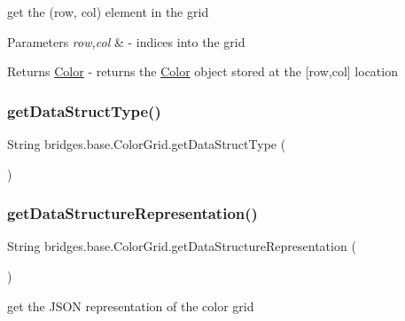 get the (row, col) element in the grid


\begin{DoxyParams}{Parameters}
{\em row,col} & -\/ indices into the grid \\
\hline
\end{DoxyParams}
\begin{DoxyReturn}{Returns}
\mbox{\hyperlink{classbridges_1_1base_1_1_color}{Color}} -\/ returns the \mbox{\hyperlink{classbridges_1_1base_1_1_color}{Color}} object stored at the \mbox{[}row,col\mbox{]} location 
\end{DoxyReturn}
\mbox{\label{classbridges_1_1base_1_1_color_grid_a53a1f3f105f8545796f98e5fac559b5b}} 
\subsubsection{\texorpdfstring{get\+Data\+Struct\+Type()}{getDataStructType()}}
{\footnotesize\ttfamily String bridges.\+base.\+Color\+Grid.\+get\+Data\+Struct\+Type (\begin{DoxyParamCaption}{ }\end{DoxyParamCaption})}

\mbox{\label{classbridges_1_1base_1_1_color_grid_a81ca0995d17b6cb31122b718dfa57286}} 
\subsubsection{\texorpdfstring{get\+Data\+Structure\+Representation()}{getDataStructureRepresentation()}}
{\footnotesize\ttfamily String bridges.\+base.\+Color\+Grid.\+get\+Data\+Structure\+Representation (\begin{DoxyParamCaption}{ }\end{DoxyParamCaption})}

get the J\+S\+ON representation of the color grid

